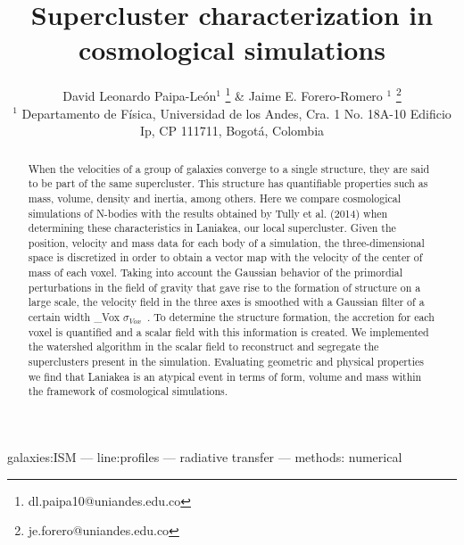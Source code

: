 \documentclass[a4paper,fleqn,usenatbib]{mnras}
\newcommand{\svox}{\ifmmode \sigma_{Vox} \else $\sigma_{Vox}$~\fi}
\begin{document}
\title[Supercluster characterization in cosmological simulations]{Supercluster characterization in cosmological simulations}  
\author[D.L. Paipa-Leon \& J.E. Forero-Romero]{
  David Leonardo  Paipa-Le\'on$^{1}$
  \thanks{dl.paipa10@uniandes.edu.co} \&
  Jaime E. Forero-Romero $^{1}$
  \thanks{je.forero@uniandes.edu.co}\\
  $^{1}$ Departamento de F\'isica, Universidad de los Andes, Cra. 1
  No. 18A-10 Edificio Ip, CP 111711, Bogot\'a, Colombia \\
}
\maketitle
\begin{abstract}
When the velocities of a group of galaxies converge to a single structure, they are said to be part of the same supercluster. This structure has quantifiable properties such as mass, volume, density and inertia, among others.
 Here we compare cosmological simulations of N-bodies with the results obtained by Tully et al. (2014)  when determining these characteristics in Laniakea, our local supercluster.
Given the position, velocity and mass data for each body of a simulation, the three-dimensional space is discretized in order to obtain a vector map with the velocity of the center of mass of each voxel. Taking into account the Gaussian behavior of the primordial perturbations in the field of gravity that gave rise to the formation of structure on a large scale, the velocity field in the three axes is smoothed with a Gaussian filter of a certain width \svox. To determine the structure formation, the accretion for each voxel is quantified and a scalar field with this information is created.
 We implemented the watershed algorithm in the scalar field to reconstruct and segregate the superclusters present in the simulation. Evaluating geometric and physical properties we find that Laniakea is an atypical event in terms of form, volume and mass within the framework of cosmological simulations.


\end{abstract}

\begin{keywords}
galaxies:ISM --- line:profiles --- radiative transfer --- methods: numerical
\end{keywords}
\end{document}
